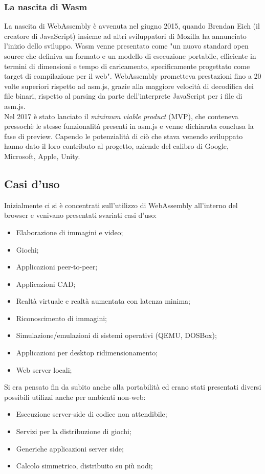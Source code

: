 \subsubsection{La nascita di Wasm}
La nascita di WebAssembly è avvenuta nel giugno 2015, quando Brendan Eich (il creatore di JavaScript) insieme ad altri sviluppatori di Mozilla ha annunciato l'inizio dello sviluppo. \cite*{asmjsToWasm}
Wasm venne presentato come "un nuovo standard open source che definiva un formato e un modello di esecuzione portabile, efficiente in termini di dimensioni e tempo di caricamento, specificamente progettato come target di compilazione per il web".
WebAssembly prometteva prestazioni fino a 20 volte superiori rispetto ad asm.js, grazie alla maggiore velocità di decodifica dei file binari, rispetto al parsing da parte dell'interprete JavaScript per i file di asm.js.
\\Nel 2017 è stato lanciato il \emph{minimum viable product} (MVP), che conteneva pressochè le stesse funzionalità presenti in asm.js e venne dichiarata conclusa la fase di preview.
Capendo le potenzialità di ciò che stava venendo sviluppato hanno dato il loro contributo al progetto, aziende del calibro di Google, Microsoft, Apple, Unity.

\subsection{Casi d'uso}
Inizialmente ci si è concentrati sull'utilizzo di WebAssembly all'interno del browser e venivano presentati svariati casi d'uso:
\begin{itemize}
        \item Elaborazione di immagini e video;
        \item Giochi;
        \item Applicazioni peer-to-peer;
        \item Applicazioni CAD;
        \item Realtà virtuale e realtà aumentata con latenza minima;
        \item Riconoscimento di immagini;
        \item Simulazione/emulazioni di sistemi operativi (QEMU, DOSBox);
        \item Applicazioni per desktop ridimensionamento;
        \item Web server locali;
\end{itemize}
Si era pensato fin da subito anche alla portabilità ed erano stati presentati diversi possibili utilizzi anche per ambienti non-web:
\begin{itemize}
        \item Esecuzione server-side di codice non attendibile;
        \item Servizi per la distribuzione di giochi;
        \item Generiche applicazioni server side;
        \item Calcolo simmetrico, distribuito su più nodi;
\end{itemize}
